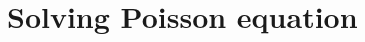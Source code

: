 \section{Solving Poisson equation}

\begin{mdframed}[backgroundcolor=mintedbg]
\inputminted[breaklines]{julia}{../poisson_01/main.jl}
\end{mdframed}
